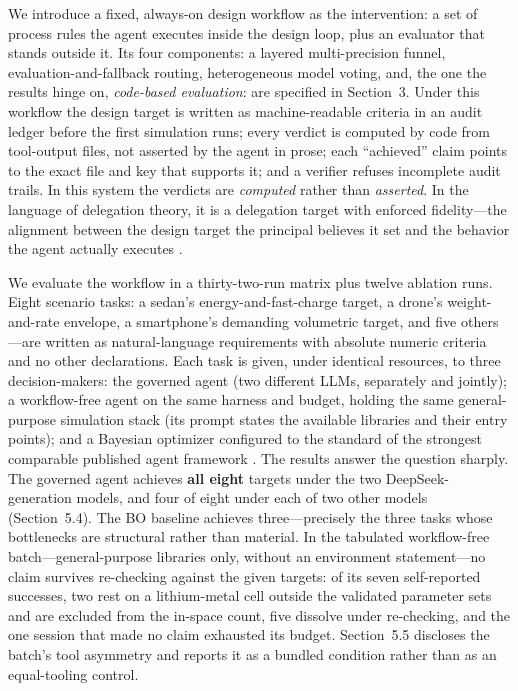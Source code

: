 We introduce a fixed, always-on design workflow as the intervention: a set of
process rules the agent executes inside the design loop, plus
an evaluator that stands outside it. Its four components: a layered
multi-precision funnel, evaluation-and-fallback routing, heterogeneous model
voting, and, the one the results hinge on,
\emph{code-based evaluation}: are specified in Section~3. Under this workflow
the design target is written as machine-readable criteria in an
audit ledger before the first simulation runs; every verdict is computed by
code from tool-output files, not asserted by the agent in prose; each
``achieved'' claim points to the exact file and key that supports it; and a
verifier refuses incomplete audit trails. In this system the verdicts are
\emph{computed} rather than \emph{asserted}. In the language of delegation
theory, it is a delegation target with enforced fidelity---the alignment
between the design target the principal believes it set and the behavior the agent
actually executes \cite{delegatedagency2026, nikpayam2024aiassisted}.

We evaluate the workflow in a thirty-two-run matrix plus twelve ablation
runs. Eight scenario tasks: a sedan's energy-and-fast-charge target, a
drone's weight-and-rate envelope, a smartphone's demanding volumetric target, and five
others---are written as natural-language requirements with absolute numeric
criteria and no other declarations. Each task is given, under identical
resources, to three decision-makers: the governed agent (two different LLMs,
separately and jointly); a workflow-free agent on the same harness and
budget, holding the same general-purpose simulation stack (its prompt states
the available libraries and their entry points); and a Bayesian optimizer
configured to the standard of the strongest comparable published agent
framework \cite{chen2026battery}.
The results answer the question sharply. The governed agent achieves
\textbf{all eight} targets under the two DeepSeek-generation models, and
four of eight under each of two other models (Section~5.4). The BO
baseline achieves
three---precisely the three tasks whose bottlenecks are structural rather than
material. In the tabulated workflow-free batch---general-purpose libraries
only, without an environment statement---no claim survives
re-checking against the given targets: of its seven self-reported successes, two
rest on a lithium-metal cell outside the validated parameter sets and are
excluded from the in-space count, five dissolve under re-checking, and
the one session that made no claim exhausted its budget. Section~5.5
discloses the batch's tool asymmetry and reports it as a bundled condition
rather than as an equal-tooling control.

